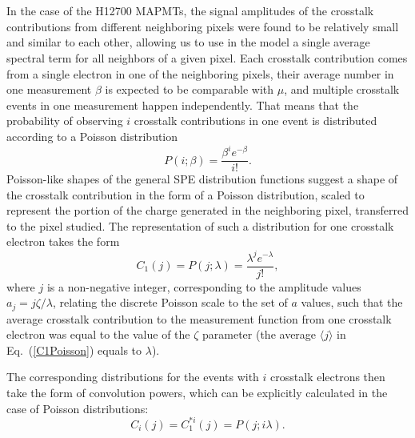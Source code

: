 \newpage
\newpage
\appendix
\section{}
\label{AppendixA}

In the case of the H12700 MAPMTs, the signal amplitudes of the crosstalk contributions from different neighboring pixels were found to be relatively small and similar to each other, allowing us to use in the model a single average spectral term for all neighbors of a given pixel. Each crosstalk contribution comes from a single electron in one of the neighboring pixels, their average number in one measurement $\beta$ is expected to be comparable with $\mu$, and multiple crosstalk events in one measurement happen independently. That means that the probability of observing $i$ crosstalk contributions in one event is distributed according to a Poisson distribution
\begin{equation}
\label{CTPoisson}
 P(i;\beta) = \frac{\beta^{i} e^{-\beta}}{i!}.
\end{equation}
Poisson-like shapes of the general SPE distribution functions suggest a shape of the crosstalk contribution in the form of a Poisson distribution, scaled to represent the portion of the charge generated in the neighboring pixel, transferred to the pixel studied. The representation of such a distribution for one crosstalk electron takes the form
\begin{equation}
\label{C1Poisson}
 C_1(j) = P(j;\lambda) = \frac{\lambda^{j} e^{-\lambda}}{j!},
\end{equation}
where $j$ is a non-negative integer, corresponding to the amplitude values $a_j = j \zeta / \lambda $, relating the discrete Poisson scale to the set of $a$ values, such that the average crosstalk contribution to the measurement function from one crosstalk electron was equal to the value of the $\zeta$ parameter (the average $\langle j \rangle$ in Eq.~(\ref{C1Poisson}) equals to $\lambda$).

The corresponding distributions for the events with $i$ crosstalk electrons then take the form of convolution powers, which can be explicitly calculated in the case of Poisson distributions: 
\begin{equation}
\label{CiPoisson}
 C_i(j) = C_1^{*i}(j) = P(j;i\lambda).
\end{equation}

